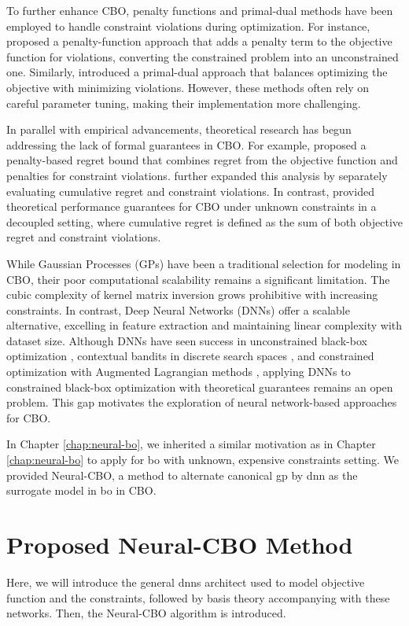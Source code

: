 To further enhance CBO, penalty functions and primal-dual methods have been employed to handle constraint violations during optimization. For instance, \citet{lu2022no} proposed a penalty-function approach that adds a penalty term to the objective function for violations, converting the constrained problem into an unconstrained one. Similarly, \citet{zhou2022kernelized} introduced a primal-dual approach that balances optimizing the objective with minimizing violations. However, these methods often rely on careful parameter tuning, making their implementation more challenging.

In parallel with empirical advancements, theoretical research has begun addressing the lack of formal guarantees in CBO. For example, \citet{lu2022no} proposed a penalty-based regret bound that combines regret from the objective function and penalties for constraint violations. \citet{xu2023constrained} further expanded this analysis by separately evaluating cumulative regret and constraint violations. In contrast, \citet{nguyen2023optimistic} provided theoretical performance guarantees for CBO under unknown constraints in a decoupled setting, where cumulative regret is defined as the sum of both objective regret and constraint violations.

While Gaussian Processes (GPs) have been a traditional selection for modeling in CBO, their poor computational scalability remains a significant limitation. The cubic complexity of kernel matrix inversion grows prohibitive with increasing constraints. In contrast, Deep Neural Networks (DNNs) offer a scalable alternative, excelling in feature extraction and maintaining linear complexity with dataset size. Although DNNs have seen success in unconstrained black-box optimization \citep{snoek2015scalable}, contextual bandits in discrete search spaces \citep{zhou2020neural,zhang2021neural}, and constrained optimization with Augmented Lagrangian methods \citep{ariafar2019admmbo}, applying DNNs to constrained black-box optimization with theoretical guarantees remains an open problem. This gap motivates the exploration of neural network-based approaches for CBO.

In Chapter \ref{chap:neural-bo}, we inherited a similar motivation as in Chapter \ref{chap:neural-bo} to apply for \ac{bo} with unknown, expensive constraints setting. We provided Neural-CBO, a method to alternate canonical \ac{gp} by \ac{dnn} as the surrogate model in \ac{bo} in CBO. 
    
\section{Proposed Neural-CBO Method}
\label{section:neural-cbo}
Here, we will introduce the general \acp{dnn} architect used to model objective function and the constraints, followed by basis theory accompanying with these networks. Then, the Neural-CBO algorithm is introduced. 


